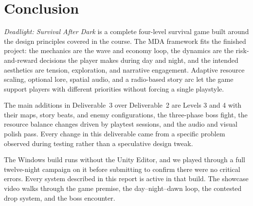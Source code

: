 \documentclass[11pt,a4paper]{article}
\begin{document}
\section{Conclusion}

\textit{Deadlight: Survival After Dark} is a complete four-level survival game built around the design principles covered in the course. The MDA framework fits the finished project: the mechanics are the wave and economy loop, the dynamics are the risk-and-reward decisions the player makes during day and night, and the intended aesthetics are tension, exploration, and narrative engagement. Adaptive resource scaling, optional lore, spatial audio, and a radio-based story arc let the game support players with different priorities without forcing a single playstyle.

The main additions in Deliverable~3 over Deliverable~2 are Levels 3 and 4 with their maps, story beats, and enemy configurations, the three-phase boss fight, the resource balance changes driven by playtest sessions, and the audio and visual polish pass. Every change in this deliverable came from a specific problem observed during testing rather than a speculative design tweak.

The Windows build runs without the Unity Editor, and we played through a full twelve-night campaign on it before submitting to confirm there were no critical errors. Every system described in this report is active in that build. The showcase video walks through the game premise, the day--night--dawn loop, the contested drop system, and the boss encounter.
\end{document}
